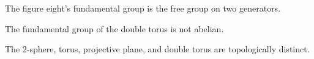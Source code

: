 \begin{remark}
The figure eight's fundamental group is the free group on two generators.
\end{remark}

\begin{theorem}
The fundamental group of the double torus is not abelian.
\end{theorem}

\begin{corollary}
The $2$-sphere, torus, projective plane, and double torus are topologically distinct.
\end{corollary}





